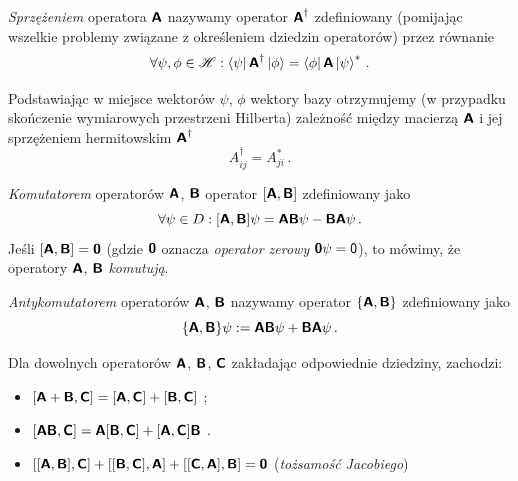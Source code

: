 \documentclass{myclass}
\begin{document}
\begin{definition}
\textit{Sprzężeniem} operatora \(\boldsymbol{\mathsf{A}}\) nazywamy operator \(\boldsymbol{\mathsf{A}}^\dagger\) zdefiniowany
(pomijając wszelkie problemy związane z określeniem dziedzin operatorów) przez równanie
\begin{equation*}
\forall \psi,\phi\in\mathscr{H}: \bra{\psi}\boldsymbol{\mathsf{A}}^\dagger\ket{\phi} = \bra{\phi}\boldsymbol{\mathsf{A}}\ket{\psi}^*\,.
\end{equation*}
\end{definition}

Podstawiając w miejsce wektorów \(\psi\), \(\phi\) wektory bazy otrzymujemy (w przypadku skończenie
wymiarowych przestrzeni Hilberta) zależność między macierzą \(\boldsymbol{\mathsf{A}}\) i jej sprzężeniem
hermitowskim \(\boldsymbol{\mathsf{A}}^\dagger\)
\begin{equation*}
A^\dagger_{ij} = A_{ji}^*\,.
\end{equation*} 

\begin{definition}
\textit{Komutatorem} operatorów \(\boldsymbol{\mathsf{A}}\), \(\boldsymbol{\mathsf{B}}\) operator \([\boldsymbol{\mathsf{A}},\boldsymbol{\mathsf{B}}]\)
zdefiniowany jako
\begin{equation*}
\forall \psi \in D : [\boldsymbol{\mathsf{A}},\boldsymbol{\mathsf{B}}]\psi = \boldsymbol{\mathsf{A}}\boldsymbol{\mathsf{B}}\psi - \boldsymbol{\mathsf{B}}\boldsymbol{\mathsf{A}}\psi\,. 
\end{equation*}
Jeśli \([\boldsymbol{\mathsf{A}},\boldsymbol{\mathsf{B}}] = \boldsymbol{\mathsf{\mathsf{0}}}\) (gdzie \(\boldsymbol{\mathsf{\mathsf{0}}}\) oznacza
\textit{operator zerowy} \(\boldsymbol{\mathsf{\mathsf{0}}}\psi=\mathsf{0}\)), to mówimy, że operatory
\(\boldsymbol{\mathsf{A}}\), \(\boldsymbol{\mathsf{B}}\) \textit{komutują}.
\end{definition}

\begin{definition}
\textit{Antykomutatorem} operatorów \(\boldsymbol{\mathsf{A}}\), \(\boldsymbol{\mathsf{B}}\) nazywamy operator
\(\{\boldsymbol{\mathsf{A}},\boldsymbol{\mathsf{B}}\}\) zdefiniowany jako
\begin{equation*}
    \{\boldsymbol{\mathsf{A}},\boldsymbol{\mathsf{B}}\}\psi := \boldsymbol{\mathsf{A}}\boldsymbol{\mathsf{B}}\psi + \boldsymbol{\mathsf{B}}\boldsymbol{\mathsf{A}}\psi\,.
\end{equation*}
\end{definition}

\begin{theorem}
Dla dowolnych operatorów \(\boldsymbol{\mathsf{A}}\), \(\boldsymbol{\mathsf{B}}\), \(\boldsymbol{\mathsf{C}}\) zakładając odpowiednie dziedziny,
zachodzi:
\begin{itemize}
    \item \([\boldsymbol{\mathsf{A}} + \boldsymbol{\mathsf{B}},\boldsymbol{\mathsf{C}}] = [\boldsymbol{\mathsf{A}},\boldsymbol{\mathsf{C}}] + [\boldsymbol{\mathsf{B}},\boldsymbol{\mathsf{C}}]\) ;
    \item \([\boldsymbol{\mathsf{A}}\boldsymbol{\mathsf{B}},\boldsymbol{\mathsf{C}}] = \boldsymbol{\mathsf{A}}[\boldsymbol{\mathsf{B}},\boldsymbol{\mathsf{C}}] +
    [\boldsymbol{\mathsf{A}},\boldsymbol{\mathsf{C}}]\boldsymbol{\mathsf{B}}\) .
    \item \([[\boldsymbol{\mathsf{A}}, \boldsymbol{\mathsf{B}}], \boldsymbol{\mathsf{C}}] + [[\boldsymbol{\mathsf{B}},\boldsymbol{\mathsf{C}}],\boldsymbol{\mathsf{A}}] + [[\boldsymbol{\mathsf{C}},
    \boldsymbol{\mathsf{A}}], \boldsymbol{\mathsf{B}}] = \boldsymbol{\mathsf{0}}\) (\textit{tożsamość Jacobiego})
\end{itemize}   
\end{theorem}
\end{document}
